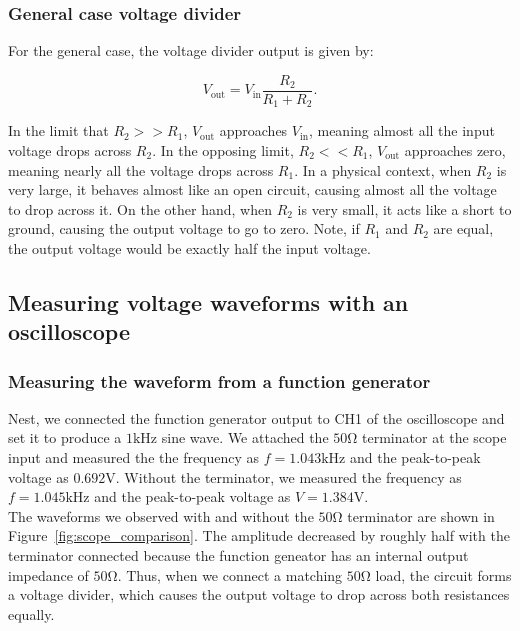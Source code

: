 \documentclass{article}
\begin{document}
\subsubsection{General case voltage divider}

For the general case, the voltage divider output is given by:

\begin{equation}
    V_\text{out}=V_\text{in}\frac{R_2}{R_1+R_2}.
\end{equation}

\noindent In the limit that $R_2 >> R_1$, $V_\text{out}$ approaches 
$V_\text{in}$, meaning almost all the input voltage drops across $R_2$.
In the opposing limit, $R_2 << R_1$, $V_\text{out}$ approaches zero, meaning
nearly all the voltage drops across $R_1$. In a physical context, when $R_2$ is
very large, it behaves almost like an open circuit, causing almost all the voltage
to drop across it. On the other hand, when $R_2$ is very small, it acts like a 
short to ground, causing the output voltage to go to zero. Note, if $R_1$ and $R_2$ 
are equal, the output voltage would be exactly half the input voltage.


\subsection{Measuring voltage waveforms with an oscilloscope}

\subsubsection{Measuring the waveform from a function generator}

Nest, we connected the function generator output to CH1 of the oscilloscope and
set it to produce a $1\si{\kilo\hertz}$ sine wave. We attached the $50\si{\ohm}$
terminator at the scope input and measured the the frequency as $f=1.043\si{\kilo\hertz}$
and the peak-to-peak voltage as $0.692\si{\volt}$. Without the terminator,
we measured the frequency as $f=1.045\si{\kilo\hertz}$ and the peak-to-peak
voltage as $V=1.384\si{\volt}$.\\

\noindent The waveforms we observed with and without the $50\si{\ohm}$ 
terminator are shown in Figure~\ref{fig:scope_comparison}. The amplitude
decreased by roughly half with the terminator connected because the function
geneator has an internal output impedance of $50\si{\ohm}$. Thus, when we
connect a matching $50\si{\ohm}$ load, the circuit forms a voltage divider, 
which causes the output voltage to drop across both resistances equally.
\end{document}
